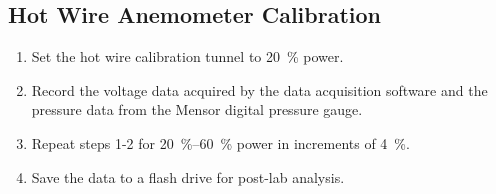 \subsection{Hot Wire Anemometer Calibration}

\begin{enumerate}
    \item Set the hot wire calibration tunnel to \qty{20}{\percent} power.
    \item Record the voltage data acquired by the data acquisition software and the pressure data from the Mensor digital pressure gauge.
    \item Repeat steps 1-2 for \qtyrange{20}{60}{\percent} power in increments of \qty{4}{\percent}.
    \item Save the data to a flash drive for post-lab analysis.
\end{enumerate}

